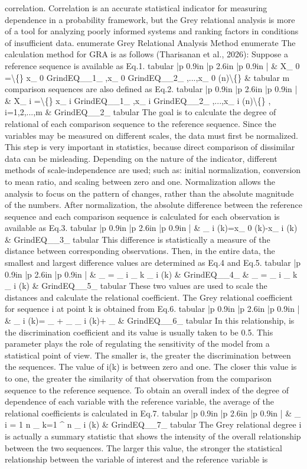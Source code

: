\documentclass[10pt,twoside]{article}
\begin{document}
\begin{minipage}[t][\textheight]{\textwidth}
correlation. Correlation is an accurate statistical indicator for measuring dependence in a probability framework, but the Grey relational analysis is more of a tool for analyzing poorly informed systems and ranking factors in conditions of insufficient data. enumerate Grey Relational Analysis Method enumerate The calculation method for GRA is as follows (Tharisanan et al., 2026): Suppose a reference sequence is available as Eq.1. tabular |p 0.9in |p 2.6in |p 0.9in | \& X\_ 0 =\textbackslash\{\} x\_ 0 GrindEQ\_\_1\_ ,x\_ 0 GrindEQ\_\_2\_ ,...,x\_ 0 (n)\textbackslash\{\} \& tabular m comparison sequences are also defined as Eq.2. tabular |p 0.9in |p 2.6in |p 0.9in | \& X\_ i =\textbackslash\{\} x\_ i GrindEQ\_\_1\_ ,x\_ i GrindEQ\_\_2\_ ,...,x\_ i (n)\textbackslash\{\} , i=1,2,...,m \& GrindEQ\_\_2\_ tabular The goal is to calculate the degree of relational of each comparison sequence to the reference sequence. Since the variables may be measured on different scales, the data must first be normalized. This step is very important in statistics, because direct comparison of dissimilar data can be misleading. Depending on the nature of the indicator, different methods of scale-independence are used; such as: initial normalization, conversion to mean ratio, and scaling between zero and one. Normalization allows the analysis to focus on the pattern of changes, rather than the absolute magnitude of the numbers. After normalization, the absolute difference between the reference sequence and each comparison sequence is calculated for each observation is available as Eq.3. tabular |p 0.9in |p 2.6in |p 0.9in | \& \_ i (k)=x\_ 0 (k)-x\_ i (k) \& GrindEQ\_\_3\_ tabular This difference is statistically a measure of the distance between corresponding observations. Then, in the entire data, the smallest and largest difference values are determined as Eq.4 and Eq.5. tabular |p 0.9in |p 2.6in |p 0.9in | \& \_ = \_ i \_ k \_ i (k) \& GrindEQ\_\_4\_ \& \_ = \_ i \_ k \_ i (k) \& GrindEQ\_\_5\_ tabular These two values are used to scale the distances and calculate the relational coefficient. The Grey relational coefficient for sequence i at point k is obtained from Eq.6. tabular |p 0.9in |p 2.6in |p 0.9in | \& \_ i (k)= \_ + \_ \_ i (k)+ \_ \& GrindEQ\_\_6\_ tabular In this relationship, is the discrimination coefficient and its value is usually taken to be 0.5. This parameter plays the role of regulating the sensitivity of the model from a statistical point of view. The smaller is, the greater the discrimination between the sequences. The value of i(k) is between zero and one. The closer this value is to one, the greater the similarity of that observation from the comparison sequence to the reference sequence. To obtain an overall index of the degree of dependence of each variable with the reference variable, the average of the relational coefficients is calculated in Eq.7. tabular |p 0.9in |p 2.6in |p 0.9in | \& \_ i = 1 n \_ k=1 \textasciicircum{} n \_ i (k) \& GrindEQ\_\_7\_ tabular The Grey relational degree i is actually a summary statistic that shows the intensity of the overall relationship between the two sequences. The larger this value, the stronger the statistical relationship between the variable of interest and the reference variable is 
\end{minipage}
\end{document}
